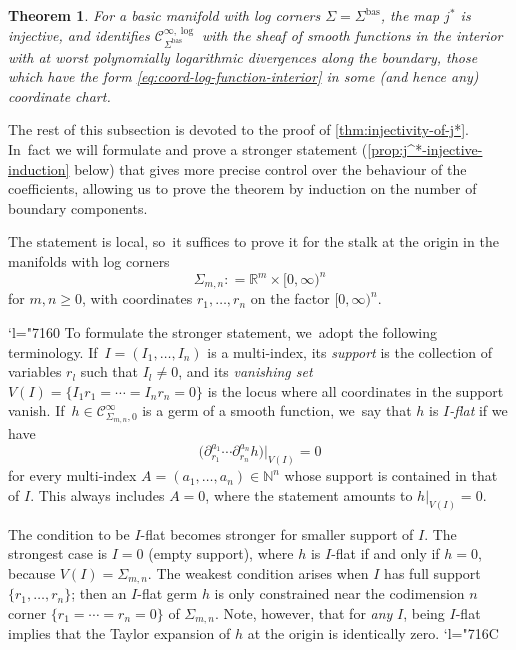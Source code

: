 \documentclass[10pt]{amsart}
\newcommand{\Changel}{\mathcode`l="7160}
\newcommand{\Changelback}{\mathcode`l="716C}
\newtheorem{theorem}{Theorem}[section]
\theoremstyle{definition}
\theoremstyle{remark}
\let\defn\emph
\newcommand{\RR}{\mathbb{R}}
\newcommand{\NN}{\mathbb{N}}
\newcommand{\halfspc}[1]{[0,\infty)^{#1}}
\renewcommand{\ge}{\geqslant}
\newcommand{\defas}{\mathrel{\mathop:}=}
\newcommand{\Cinf}[1]{\mathscr{C}^{\infty}_{#1}}
\newcommand{\Cinflog}[1]{\mathscr{C}^{\infty,\log}_{#1}}
\newcommand{\cvf}[1]{\partial_{#1}}
\newcommand{\Sig}{\Sigma}
\newcommand{\bas}[1]{{#1}^{\mathrm{bas}}}
\newcommand{\Sigbas}{\bas{\Sig}}
\begin{document}
\begin{theorem}\label{thm:injectivity-of-j*}
For a basic manifold with log corners $\Sig = \Sigbas$, the map $j^*$ is injective, and identifies $\Cinflog{\Sigbas}$ with the sheaf of smooth functions in the interior with at worst polynomially logarithmic divergences along the boundary, \ie those which have the form \eqref{eq:coord-log-function-interior} in some (and hence any) coordinate chart.
\end{theorem}

The rest of this subsection is devoted to the proof of \autoref{thm:injectivity-of-j*}. In~fact we will formulate and prove a stronger statement (\autoref{prop:j^*-injective-induction} below) that gives more precise control over the behaviour of the coefficients, allowing us to prove the theorem by induction on the number of boundary components.

The statement is local, so~it suffices to prove it for the stalk at the origin in the manifolds with log corners
\begin{equation*}
\Sig_{m,n} \defas \RR^m \times [0,\infty)^n
\end{equation*}
for $m,n \ge 0$, with coordinates $r_1,\ldots,r_n$ on the factor $\halfspc{n}$.

\Changel{}
To formulate the stronger statement, we~adopt the following terminology. If~$I = (I_1,\ldots,I_n)$ is a multi-index, its \defn{support} is the collection of variables $r_l$ such that $I_l\neq 0$, and its \defn{vanishing set} $V(I)=\{I_1 r_1=\cdots=I_n r_n=0\}$ is the locus where all coordinates in the support vanish. If~$h \in \Cinf{\Sig_{m,n},0}$ is a germ of a smooth function, we~say that $h$ is \defn{$I$\nobreakdash-flat} if we have
\begin{equation*}
\big(\cvf{r_1}^{a_1}\cdots \cvf{r_n}^{a_n} h \big)\Big|_{V(I)} = 0
\end{equation*}
for every multi-index $A = (a_1,\ldots,a_n)\in\NN^n$ whose support is contained in that of $I$. This always includes $A =0$, where the statement amounts to $h|_{V(I)} = 0$.

The condition to be $I$\nobreakdash-flat becomes stronger for smaller support of $I$. The strongest case is $I=0$ (empty support), where $h$ is $I$\nobreakdash-flat if and only if $h=0$, because $V(I)=\Sig_{m,n}$. The weakest condition arises when $I$ has full support $\{r_1,\ldots,r_n\}$; then an $I$\nobreakdash-flat germ $h$ is only constrained near the codimension $n$ corner $\{r_1=\cdots=r_n=0\}$ of $\Sig_{m,n}$. Note, however, that for \emph{any} $I$, being $I$\nobreakdash-flat implies that the Taylor expansion of $h$ at the origin is identically zero.
\Changelback
\end{document}
